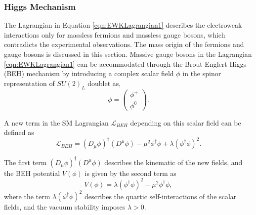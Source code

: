 \subsubsection{Higgs Mechanism}
\label{subsubsec:HiggsMech}

The Lagrangian in Equation \ref{eqn:EWKLagrangian1} describes the electroweak interactions only for massless fermions and massless gauge bosons, which contradicts the experimental observations. The mass origin of the fermions and gauge bosons is discussed in this section. Massive gauge bosons in the Lagrangian \ref{eqn:EWKLagrangian1} can be accommodated through the Brout-Englert-Higgs (BEH) mechanism by introducing a complex scalar field $\phi$ in the spinor representation of $SU(2)_{L}$ doublet \cite{HiggsMechanism} as,
\begin{equation}
\phi = \begin{pmatrix} \phi^{+} \\ \phi^{0} \end{pmatrix}.
\end{equation}

A new term in the SM Lagrangian $\mathcal{L}_{BEH}$ depending on this scalar field can be defined as 
\begin{equation}
\mathcal{L}_{BEH}  = (D_{\mu} \phi)^{\dagger} ( D^{\mu} \phi) - \mu^2 \phi^{\dagger} \phi + \lambda (\phi^{\dagger} \phi)^2.
\label{eqn:LagBEH}
\end{equation}

The first term $(D_{\mu} \phi)^{\dagger} ( D^{\mu} \phi)$ describes the kinematic of the new fields, and the BEH potential $V(\phi)$ is given by the second term as 
\begin{equation}
V(\phi) = \lambda (\phi^{\dagger} \phi)^2 - \mu^2 \phi^{\dagger} \phi,
\label{eqn:HiggsPot}
\end{equation}
where the term $\lambda (\phi^{\dagger} \phi)^2$ describes the quartic self-interactions of the scalar fields, and the vacuum stability imposes $\lambda > 0 $. 

